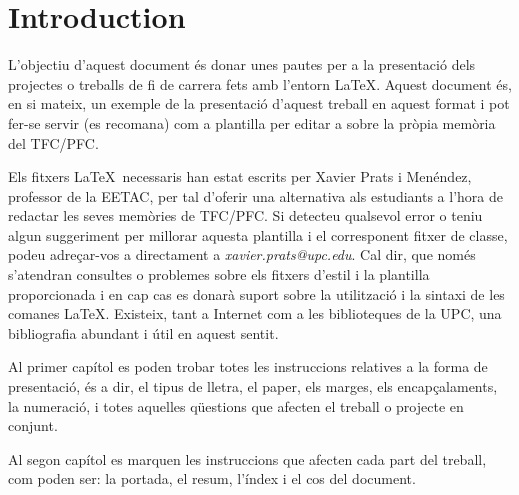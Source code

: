 \cleardoublepage
{}
\chapter*{Introduction}
L'objectiu d'aquest document és donar unes pautes per a la presentació dels projectes o treballs de fi de carrera fets amb l'entorn \LaTeX. Aquest document és, en si mateix, un exemple de la presentació d'aquest treball en aquest format i pot fer-se servir (es recomana) com a plantilla per editar a sobre la pròpia memòria del TFC/PFC.

Els fitxers \LaTeX \ necessaris han estat escrits per Xavier Prats i Menéndez, professor de la EETAC, per tal d'oferir una alternativa als estudiants a l'hora de redactar les seves memòries de TFC/PFC. Si detecteu qualsevol error o teniu algun suggeriment per millorar aquesta plantilla i el corresponent fitxer de classe, podeu adreçar-vos a directament a \emph{xavier.prats@upc.edu}. Cal dir, que només s'atendran consultes o problemes sobre els fitxers d'estil i la plantilla proporcionada i en cap cas es donarà suport sobre la utilització i la sintaxi de les comanes \LaTeX. Existeix, tant a Internet com a les biblioteques de la UPC, una  bibliografia abundant i útil en aquest sentit. 

Al primer capítol es poden trobar totes les instruccions relatives a la forma de presentació, és a dir, el tipus de lletra, el paper, els marges, els encapçalaments, la numeració, i totes aquelles qüestions que afecten el treball o projecte en conjunt.

Al segon capítol es marquen les instruccions que afecten cada part del treball, com poden ser: la portada, el resum, l'índex i el cos del document.
